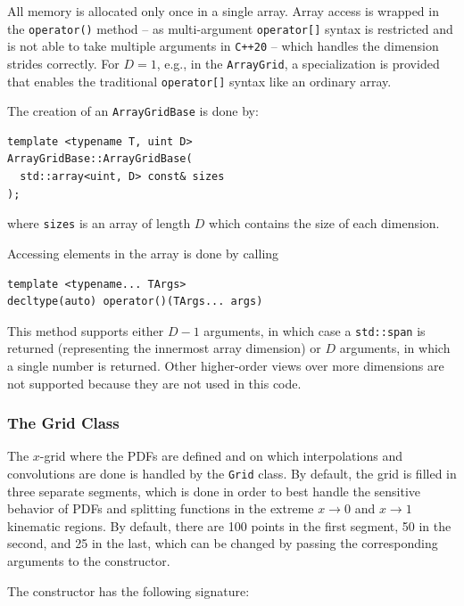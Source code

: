\documentclass[preprint,12pt]{elsarticle}
\begin{document}
All memory is allocated only once in a single array. Array access is wrapped in the \texttt{operator()} method -- as multi-argument \texttt{operator[]} 
syntax is restricted and is not able to take multiple arguments in \texttt{C++20} -- which handles the dimension strides correctly. For $D=1$, e.g., in the \texttt{ArrayGrid}, a specialization is provided that enables the traditional \texttt{operator[]} syntax like an ordinary array.

The creation of an \texttt{ArrayGridBase} is done by:

\begin{verbatim}
template <typename T, uint D>
ArrayGridBase::ArrayGridBase(
  std::array<uint, D> const& sizes
);
\end{verbatim}

where \texttt{sizes} is an array of length $D$ which contains the size of each dimension.

Accessing elements in the array is done by calling

\begin{verbatim}
template <typename... TArgs>
decltype(auto) operator()(TArgs... args)
\end{verbatim}

This method supports either $D-1$ arguments, in which case a \texttt{std::span} is returned (representing the innermost array dimension) or $D$ arguments, in which a single number is returned. Other higher-order views over more dimensions are not supported because they are not used in this code.

\subsubsection{The Grid Class}
\label{subsec:grid-class}

The $x$-grid where the PDFs are defined and on which interpolations and convolutions are done is handled by the \texttt{Grid} class. By default, the grid is filled in three separate segments, which is done in order to best handle the sensitive behavior of PDFs and splitting functions in the extreme $x \rightarrow 0$ and $x \rightarrow 1$ kinematic regions. By default, there are 100 points in the first segment, 50 in the second, and 25 in the last, which can be changed by passing the corresponding arguments to the constructor.

The constructor has the following signature:
\end{document}
